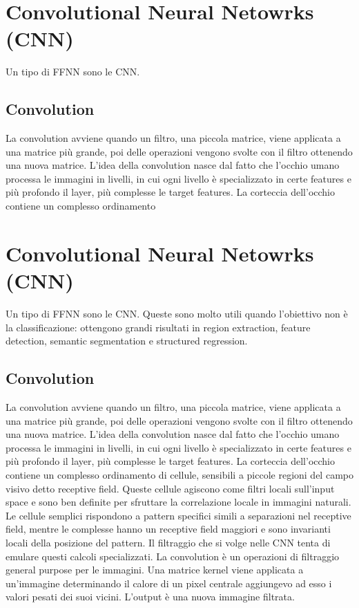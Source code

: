 \section{Convolutional Neural Netowrks (CNN)}
Un tipo di FFNN sono le CNN.

	\subsection{Convolution}
	La convolution avviene quando un filtro, una piccola matrice, viene applicata a una matrice pi\`u grande, poi delle operazioni vengono svolte con il filtro ottenendo una nuova matrice.
	L'idea della convolution nasce dal fatto che l'occhio umano processa le immagini in livelli, in cui ogni livello \`e specializzato in certe features e pi\`u profondo il layer, pi\`u complesse le target features.
	La corteccia dell'occhio contiene un complesso ordinamento\section{Convolutional Neural Netowrks (CNN)}
	Un tipo di FFNN sono le CNN.
	Queste sono molto utili quando l'obiettivo non \`e la classificazione: ottengono grandi risultati in region extraction, feature detection, semantic segmentation e structured regression.

		\subsection{Convolution}
		La convolution avviene quando un filtro, una piccola matrice, viene applicata a una matrice pi\`u grande, poi delle operazioni vengono svolte con il filtro ottenendo una nuova matrice.
		L'idea della convolution nasce dal fatto che l'occhio umano processa le immagini in livelli, in cui ogni livello \`e specializzato in certe features e pi\`u profondo il layer, pi\`u complesse le target features.
		La corteccia dell'occhio contiene un complesso ordinamento di cellule, sensibili a piccole regioni del campo visivo detto receptive field.
		Queste cellule agiscono come filtri locali sull'input space e sono ben definite per sfruttare la correlazione locale in immagini naturali.
		Le cellule semplici rispondono a pattern specifici simili a separazioni nel receptive field, mentre le complesse hanno un receptive field maggiori e sono invarianti locali della posizione del pattern.
		Il filtraggio che si volge nelle CNN tenta di emulare questi calcoli specializzati.
		La convolution \`e un operazioni di filtraggio general purpose per le immagini.
		Una matrice kernel viene applicata a un'immagine determinando il calore di un pixel centrale aggiungevo ad esso i valori pesati dei suoi vicini.
		L'output \`e una nuova immagine filtrata.

